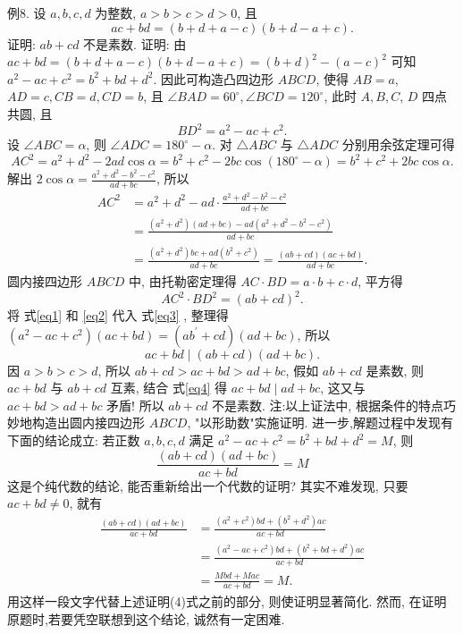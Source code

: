 例8. 设 $a, b, c, d$ 为整数, $a>b>c>d>0$, 且
$$
a c+b d=(b+d+a-c)(b+d-a+c) .
$$
证明: $a b+c d$ 不是素数.
证明: 由 $a c+b d=(b+d+a-c)(b+d-a+c)=(b+d)^2-(a-c)^2$ 可知 $a^2-a c+c^2=b^2+b d+d^2$. 因此可构造凸四边形 $A B C D$, 使得 $A B=a$, $A D=c, C B=d, C D=b$, 且 $\angle B A D=60^{\circ}, \angle B C D=120^{\circ}$, 此时 $A, B, C$, $D$ 四点共圆, 且
$$
B D^2=a^2-a c+c^2 . \label{eq1}
$$
设 $\angle A B C=\alpha$, 则 $\angle A D C=180^{\circ}-\alpha$. 对 $\triangle A B C$ 与 $\triangle A D C$ 分别用余弦定理可得
$$
A C^2=a^2+d^2-2 a d \cos \alpha=b^2+c^2-2 b c \cos \left(180^{\circ}-\alpha\right)=b^2+c^2+2 b c \cos \alpha .
$$
解出 $2 \cos \alpha=\frac{a^2+d^2-b^2-c^2}{a d+b c}$, 所以
$$
\begin{aligned}
A C^2 & =a^2+d^2-a d \cdot \frac{a^2+d^2-b^2-c^2}{a d+b c} \\
& =\frac{\left(a^2+d^2\right)(a d+b c)-a d\left(a^2+d^2-b^2-c^2\right)}{a d+b c} \\
& =\frac{\left(a^2+d^2\right) b c+a d\left(b^2+c^2\right)}{a d+b c}=\frac{(a b+c d)(a c+b d)}{a d+b c} . \label{eq2}
\end{aligned}
$$
圆内接四边形 $A B C D$ 中, 由托勒密定理得 $A C \cdot B D=a \cdot b+c \cdot d$, 平方得
$$
A C^2 \cdot B D^2=(a b+c d)^2 . \label{eq3}
$$
将 式\ref{eq1} 和 \ref{eq2} 代入 式\ref{eq3} , 整理得 $\left(a^2-a c+c^2\right)(a c+b d)=\left(a b^{\prime}+c d\right)(a d+b c)$, 所以
$$
a c+b d \mid(a b+c d)(a d+b c) . \label{eq4}
$$
因 $a>b>c>d$, 所以 $a b+c d>a c+b d>a d+b c$, 假如 $a b+c d$ 是素数, 则 $a c+b d$ 与 $a b+c d$ 互素, 结合 式\ref{eq4} 得 $a c+b d \mid a d+b c$, 这又与 $a c+b d> a d+b c$ 矛盾! 所以 $a b+c d$ 不是素数.
注:以上证法中, 根据条件的特点巧妙地构造出圆内接四边形 $A B C D$, "以形助数"实施证明.
进一步,解题过程中发现有下面的结论成立:
若正数 $a, b, c, d$ 满足 $a^2-a c+c^2=b^2+b d+d^2=M$, 则
$$
\frac{(a b+c d)(a d+b c)}{a c+b d}=M
$$
这是个纯代数的结论, 能否重新给出一个代数的证明?
其实不难发现, 只要 $a c+b d \neq 0$, 就有
$$
\begin{aligned}
\frac{(a b+c d)(a d+b c)}{a c+b d} & =\frac{\left(a^2+c^2\right) b d+\left(b^2+d^2\right) a c}{a c+b d} \\
& =\frac{\left(a^2-a c+c^2\right) b d+\left(b^2+b d+d^2\right) a c}{a c+b d} \\
& =\frac{M b d+M a c}{a c+b d}=M .
\end{aligned}
$$
用这样一段文字代替上述证明(4)式之前的部分, 则使证明显著简化.
然而, 在证明原题时,若要凭空联想到这个结论, 诚然有一定困难.


